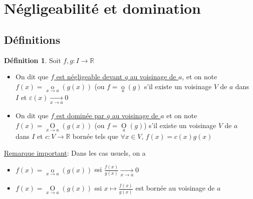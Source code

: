 \documentclass[10pt,a4paper]{article}
\theoremstyle{definition}
\newtheorem{definition}[proposition]{Définition}
\DeclareMathOperator*{\negl}{o}
\DeclareMathOperator*{\dom}{O}
\begin{document}
\section{Négligeabilité et domination}
\subsection{Définitions}
\begin{definition}
Soit $f,g: I \to \mathbb{R}$
\begin{itemize}
\item On dit que \uline{$f$ est négligeable devant $g$ au voisinage de $a$}, et on note $f(x) = \negl\limits_{x \to a} (g(x))$ (ou $f = \negl\limits_{a}(g)$ s'il existe un voisinage $V$ de $a$ dans $I$ et $\varepsilon(x) \xrightarrow[x \to a]{} 0$
\item On dit que \uline{$f$ est dominée par $g$ au voisinage de $a$} et on note $f(x) = \dom\limits_{x \to a}(g(x))$ (ou $f = \dom\limits_{a}(g)$) s'il existe un voisinage $V$ de $a$ dans $I$ et $c: V \to \mathbb{R}$ bornée tels que $\forall x \in V$, $f(x) = c(x) g(x)$
\end{itemize}
\end{definition}
\medskip
\noindent \uline{Remarque important}: Dans les cas usuels, on a
\begin{itemize}
\item $f(x) = \negl\limits_{x \to a}(g(x))$ ssi $\frac{f(x)}{g(x)} \xrightarrow[x \to a]{} 0$
\item $f(x) = \dom\limits_{x \to a}(g(x))$ ssi $x \mapsto \frac{f(x)}{g(x)}$ est bornée au voisinage de $a$
\end{itemize}
\end{document}

